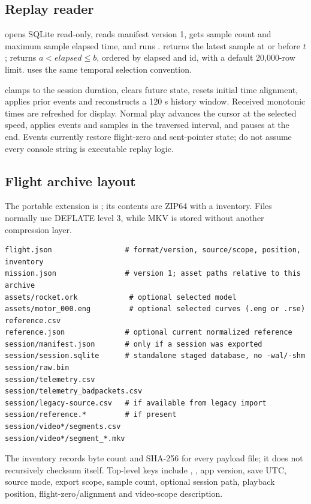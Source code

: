 \subsection{Replay reader}
 opens SQLite read-only, reads manifest version 1, gets sample
count and maximum sample elapsed time, and runs .
 returns the latest sample at or before \(t\);
 returns \(a<elapsed\le b\), ordered by elapsed and id,
with a default 20,000-row limit.  uses the same temporal
selection convention.

 clamps to the session duration, clears future state, resets initial
time alignment, applies prior events and reconstructs a 120 s history window.
Received monotonic times are refreshed for display. Normal play advances the
cursor at the selected speed, applies events and samples in the traversed
interval, and pauses at the end. Events currently restore flight-zero and
sent-pointer state; do not assume every console string is executable replay logic.

\subsection{Flight archive layout}
The portable extension is ; its contents are ZIP64 with a
 inventory. Files normally use DEFLATE level 3, while MKV is
stored without another compression layer.

\begin{lstlisting}
flight.json                 # format/version, source/scope, position, inventory
mission.json                # version 1; asset paths relative to this archive
assets/rocket.ork            # optional selected model
assets/motor_000.eng         # optional selected curves (.eng or .rse)
reference.csv
reference.json              # optional current normalized reference
session/manifest.json       # only if a session was exported
session/session.sqlite      # standalone staged database, no -wal/-shm
session/raw.bin
session/telemetry.csv
session/telemetry_badpackets.csv
session/legacy-source.csv   # if available from legacy import
session/reference.*         # if present
session/video*/segments.csv
session/video*/segment_*.mkv
\end{lstlisting}
The inventory records byte count and SHA-256 for every payload file; it does not
recursively checksum itself. Top-level keys include
, ,
app version, save UTC, source mode, export scope, sample count, optional session
path, playback position, flight-zero/alignment and video-scope description.

